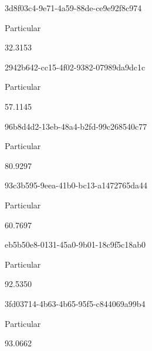 \documentclass[
  11pt,
  a4paper,
  DIV=11,
  numbers=noendperiod]{scrartcl}
\begin{document}
\n    

\n    

\n      

3d8f03c4-9e71-4a59-88de-ce9e92f8c974

\n      

Particular

\n      

32.3153

\n    

\n    

\n      

2942b642-cc15-4f02-9382-07989da9dc1c

\n      

Particular

\n      

57.1145

\n    

\n    

\n      

96b8d4d2-13eb-48a4-b2fd-99c268540c77

\n      

Particular

\n      

80.9297

\n    

\n    

\n      

93c3b595-9eea-41b0-bc13-a1472765da44

\n      

Particular

\n      

60.7697

\n    

\n    

\n      

eb5b50e8-0131-45a0-9b01-18c9f5c18ab0

\n      

Particular

\n      

92.5350

\n    

\n    

\n      

3fd03714-4b63-4b65-95f5-c844069a99b4

\n      

Particular

\n      

93.0662

\n    

\n    
\end{document}
